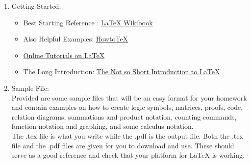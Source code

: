 \documentclass[11pt]{article}
\begin{document}
\begin{enumerate}
\item {\large Getting Started:}

\begin{itemize}
\item Best Starting Reference : {\color{blue}\href{http://en.wikibooks.org/wiki/LaTeX}{LaTeX Wikibook}}

\item Also Helpful Examples: {\color{blue}\href{http://www.howtotex.com/}{HowtoTeX}}

\item {\color{blue}\href{http://www.tug.org.in/tutorials.html}{Online Tutorials on LaTeX}}

\item The Long Introduction: {\color{blue}\href{http://tobi.oetiker.ch/lshort/lshort-letter.pdf}{The Not so Short Introduction to LaTeX}}

\end{itemize}


\item {\large Sample File:}\\

\noindent
  Provided are some sample files that will be an easy format for your homework and contain examples on how to create logic symbols, matrices, proofs, code, relation diagrams, summations and product notation, counting commands, function notation and graphing, and some calculus notation. \\
	
The .tex file is what you write while the .pdf is the output file. Both the .tex file and the .pdf files  are given for you to download and use. These should serve as a good reference and check that your platform for LaTeX is working. 


\end{enumerate}
\end{document}
